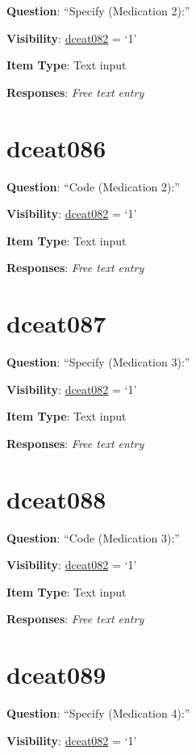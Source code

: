 \documentclass[]{book}
\begin{document}
\textbf{Question}: ``Specify (Medication 2):''

\textbf{Visibility}: \protect\hyperlink{dceat082}{dceat082} = `1'

\textbf{Item Type}: Text input

\textbf{Responses}: \emph{Free text entry}

\hypertarget{dceat086}{%
\section{dceat086}\label{dceat086}}

\textbf{Question}: ``Code (Medication 2):''

\textbf{Visibility}: \protect\hyperlink{dceat082}{dceat082} = `1'

\textbf{Item Type}: Text input

\textbf{Responses}: \emph{Free text entry}

\hypertarget{dceat087}{%
\section{dceat087}\label{dceat087}}

\textbf{Question}: ``Specify (Medication 3):''

\textbf{Visibility}: \protect\hyperlink{dceat082}{dceat082} = `1'

\textbf{Item Type}: Text input

\textbf{Responses}: \emph{Free text entry}

\hypertarget{dceat088}{%
\section{dceat088}\label{dceat088}}

\textbf{Question}: ``Code (Medication 3):''

\textbf{Visibility}: \protect\hyperlink{dceat082}{dceat082} = `1'

\textbf{Item Type}: Text input

\textbf{Responses}: \emph{Free text entry}

\hypertarget{dceat089}{%
\section{dceat089}\label{dceat089}}

\textbf{Question}: ``Specify (Medication 4):''

\textbf{Visibility}: \protect\hyperlink{dceat082}{dceat082} = `1'
\end{document}
